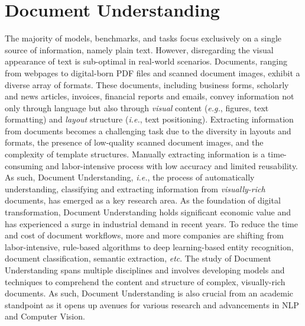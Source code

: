 \section{Document Understanding}

The majority of models, benchmarks, and tasks focus exclusively on a single source of information, namely plain text. However, disregarding the visual appearance of text is sub-optimal in real-world scenarios. Documents, ranging from webpages to digital-born PDF files and scanned document images, exhibit a diverse array of formats. These documents, including business forms, scholarly and news articles, invoices, financial reports and emails, convey information not only through language but also through \textit{visual} content (\textit{e.g.}, figures, text formatting) and \textit{layout} structure (\textit{i.e.}, text positioning). Extracting information from documents becomes a challenging task due to the diversity in layouts and formats, the presence of low-quality scanned document images, and the complexity of template structures. Manually extracting information is a time-consuming and labor-intensive process with low accuracy
and limited reusability. As such, Document Understanding, \textit{i.e.}, the process of automatically understanding, classifying and extracting information from \textit{visually-rich} documents, has emerged as a key research area. As the foundation of digital transformation, Document Understanding holds significant economic value and has experienced a surge in industrial demand in recent years. To reduce the time and cost of document workflows, more and more companies are shifting from labor-intensive, rule-based algorithms to deep learning-based entity recognition, document classification, semantic extraction, \textit{etc}. The study of Document Understanding spans multiple disciplines and involves developing models and techniques to comprehend the content and structure of complex, visually-rich documents. As such, Document Understanding is also crucial from an academic standpoint as it opens up avenues for various research and advancements in \ac{NLP} and Computer Vision. 

